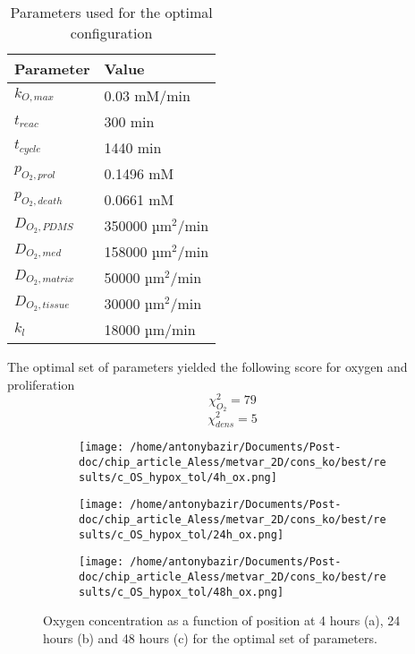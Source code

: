 \documentclass[11pt,a4paper]{article}
\begin{document}
\begin{table}[ht]
\begin{center}
\begin{tabular}{ |p{25mm}|p{30mm}| }
\hline
 \textbf{Parameter}  & \textbf{Value}\\
 \hline
  \hline
 $k_{O,max}$ & 0.03 mM/min \\
  \hline
 $t_{reac}$ & 300 min \\ 
  \hline
   $t_{cycle}$ & 1440 min  \\
 \hline 
 $p_{O_2,prol}$ & 0.1496 mM \\
  \hline
 $p_{O_2,death}$ & 0.0661 mM \\
 \hline
 $D_{O_2,PDMS}$ & 350000 µm$^2$/min  \\
 \hline 
  $D_{O_2,med}$ & 158000 µm$^2$/min   \\
 \hline 
  $D_{O_2,matrix}$ & 50000 µm$^2$/min  \\
 \hline  
  $D_{O_2,tissue}$ & 30000 µm$^2$/min \\
  \hline
  $k_{l}$ & 18000 µm/min  \\
  \hline
\end{tabular}
\caption{Parameters used for the optimal configuration \label{tab:2}}
\end{center}
\end{table}

The optimal set of parameters yielded the following score for oxygen and proliferation 
\[\chi^2_{O_2} = 79 \]
\[\chi^2_{dens} =  5\]


\begin{figure}[ht!]
\begin{subfigure}{0.33\textwidth}
	\centering
	\texttt{[image: /home/antonybazir/Documents/Post-doc/chip\_article\_Aless/metvar\_2D/cons\_ko/best/results/c\_OS\_hypox\_tol/4h\_ox.png]}
	\caption{ \label{4h_ox_best}}
\end{subfigure}
\begin{subfigure}{0.33\textwidth}
	\centering
	\texttt{[image: /home/antonybazir/Documents/Post-doc/chip\_article\_Aless/metvar\_2D/cons\_ko/best/results/c\_OS\_hypox\_tol/24h\_ox.png]}
	\caption{ \label{24h_ox_best}}
\end{subfigure}
\begin{subfigure}{0.33\textwidth}
	\centering
	\texttt{[image: /home/antonybazir/Documents/Post-doc/chip\_article\_Aless/metvar\_2D/cons\_ko/best/results/c\_OS\_hypox\_tol/48h\_ox.png]}
	\caption{ \label{48h_ox_best}}
\end{subfigure}
\caption{Oxygen concentration as a function of position at 4 hours (a), 24 hours (b) and 48 hours (c) for the optimal set of parameters.\label{Ox_best}}
\end{figure}
\end{document}

